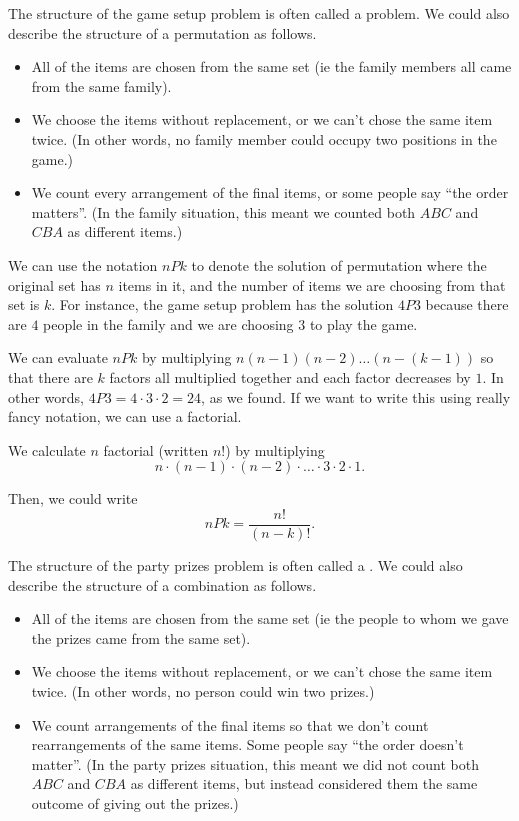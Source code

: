 \documentclass{ximera}
\begin{document}
The structure of the game setup problem is often called a  problem. We could also describe the structure of a permutation as follows.
\begin{itemize}
\item All of the items are chosen from the same set (ie the family members all came from the same family).
\item We choose the items without replacement, or we can't chose the same item twice. (In other words, no family member could occupy two positions in the game.)
\item We count every arrangement of the final items, or some people say ``the order matters''. (In the family situation, this meant we counted both $ABC$ and $CBA$ as different items.)
\end{itemize}

We can use the notation $nPk$ to denote the solution of permutation where the original set has $n$ items in it, and the number of items we are choosing from that set is $k$. For instance, the game setup problem has the solution $4P3$ because there are $4$ people in the family and we are choosing $3$ to play the game.

We can evaluate $nPk$ by multiplying $n (n-1)(n-2) \dots (n-(k-1))$ so that there are $k$ factors all multiplied together and each factor decreases by $1$. In other words, $4P3 = 4 \cdot 3 \cdot 2 = 24$, as we found. If we want to write this using really fancy notation, we can use a factorial.
\begin{definition}
We calculate $n$ factorial (written $n!$) by multiplying
\[
n \cdot (n-1) \cdot (n-2) \cdot \dots \cdot 3 \cdot 2 \cdot 1.
\]
\end{definition}
Then, we could write
\[
nPk = \frac{n!}{(n-k)!}.
\]

The structure of the party prizes problem is often called a . We could also describe the structure of a combination as follows.
\begin{itemize}
\item All of the items are chosen from the same set (ie the people to whom we gave the prizes came from the same set).
\item We choose the items without replacement, or we can't chose the same item twice. (In other words, no person  could win two prizes.)
\item We count  arrangements of the final items so that we don't count rearrangements of the same items. Some people say ``the order doesn't matter''. (In the party prizes situation, this meant we did not count both $ABC$ and $CBA$ as different items, but instead considered them the same outcome of giving out the prizes.)
\end{itemize}
\end{document}

